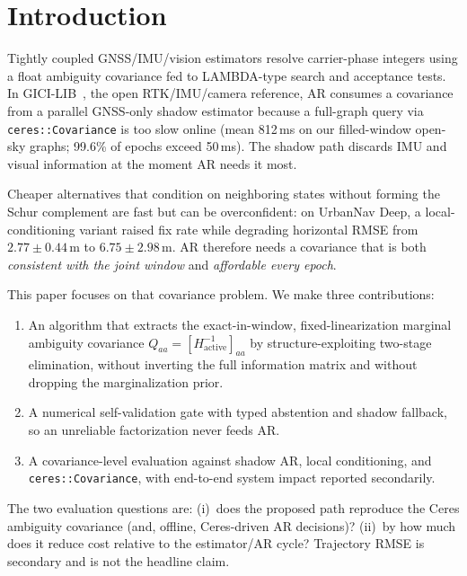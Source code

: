 \documentclass[letterpaper, journal, twocolumn]{IEEEtran}
\begin{document}
\section{Introduction}
\label{sec:intro}

Tightly coupled GNSS/IMU/vision estimators resolve carrier-phase integers
using a float ambiguity covariance fed to LAMBDA-type search and acceptance
tests.
In GICI-LIB~\cite{chi2023gici}, the open RTK/IMU/camera reference, AR
consumes a covariance from a parallel GNSS-only shadow estimator because a
full-graph query via \texttt{ceres::Covariance} is too slow online
(mean 812\,ms on our filled-window open-sky graphs; 99.6\% of epochs exceed
50\,ms).
The shadow path discards IMU and visual information at the moment AR needs it
most.

Cheaper alternatives that condition on neighboring states without forming the
Schur complement are fast but can be overconfident: on UrbanNav Deep, a
local-conditioning variant raised fix rate while degrading horizontal RMSE
from $2.77{\pm}0.44$\,m to $6.75{\pm}2.98$\,m.
AR therefore needs a covariance that is both \emph{consistent with the joint
window} and \emph{affordable every epoch}.

This paper focuses on that covariance problem.
We make three contributions:
\begin{enumerate}
\item An algorithm that extracts the exact-in-window, fixed-linearization
  marginal ambiguity
  covariance $Q_{aa}=[H_{\mathrm{active}}^{-1}]_{aa}$ by structure-exploiting
  two-stage elimination, without inverting the full information matrix and
  without dropping the marginalization prior.
\item A numerical self-validation gate with typed abstention and shadow
  fallback, so an unreliable factorization never feeds AR.
\item A covariance-level evaluation against shadow AR, local conditioning, and
  \texttt{ceres::Covariance}, with end-to-end system impact reported secondarily.
\end{enumerate}

The two evaluation questions are: (i)~does the proposed path reproduce the
Ceres ambiguity covariance (and, offline, Ceres-driven AR decisions)?
(ii)~by how much does it reduce cost relative to the estimator/AR cycle?
Trajectory RMSE is secondary and is not the headline claim.

\end{document}
